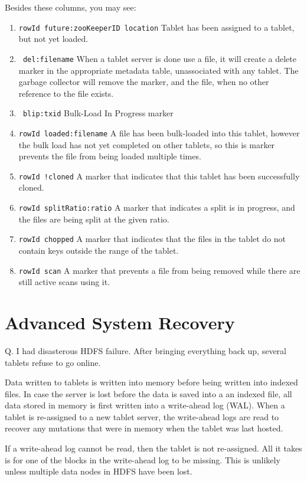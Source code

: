 Besides these columns, you may see:

\begin{enumerate}
\item{\texttt{rowId future:zooKeeperID location} Tablet has been assigned to a tablet, but not yet loaded.}
\item{\texttt{~del:filename} When a tablet server is done use a file, it will create a delete marker in the appropriate metadata table, unassociated with any tablet.  The garbage collector will remove the marker, and the file, when no other reference to the file exists.}
\item{\texttt{~blip:txid} Bulk-Load In Progress marker}
\item{\texttt{rowId loaded:filename} A file has been bulk-loaded into this tablet, however the bulk load has not yet completed on other tablets, so this is marker prevents the file from being loaded multiple times.}
\item{\texttt{rowId !cloned} A marker that indicates that this tablet has been successfully cloned.}
\item{\texttt{rowId splitRatio:ratio} A marker that indicates a split is in progress, and the files are being split at the given ratio.}
\item{\texttt{rowId chopped} A marker that indicates that the files in the tablet do not contain keys outside the range of the tablet.}
\item{\texttt{rowId scan} A marker that prevents a file from being removed while there are still active scans using it.}

\end{enumerate}

\section{Advanced System Recovery}

Q. I had disasterous HDFS failure.  After bringing everything back up, several tablets refuse to go online.

Data written to tablets is written into memory before being written into indexed files.  In case the server
is lost before the data is saved into a an indexed file, all data stored in memory is first written into a
write-ahead log (WAL).  When a tablet is re-assigned to a new tablet server, the write-ahead logs are read to
recover any mutations that were in memory when the tablet was last hosted.

If a write-ahead log cannot be read, then the tablet is not re-assigned.  All it takes is for one of
the blocks in the write-ahead log to be missing.  This is unlikely unless multiple data nodes in HDFS have been
lost.

